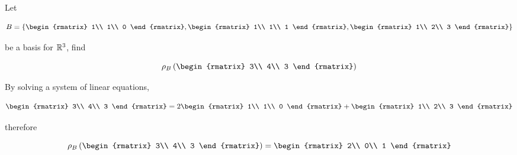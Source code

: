 \documentclass[a4paper,12pt]{article}
\begin{document}
\begin{exm}
  Let
  
  $$B=\brc{\begin{rmatrix}
    1\\
    1\\
    0
  \end{rmatrix},\begin{rmatrix}
    1\\
    1\\
    1
  \end{rmatrix},\begin{rmatrix}
    1\\
    2\\
    3
  \end{rmatrix}}$$\s

  be a basis for $\mathbb{R}^{3}$, find

  $$\rho_{B}\brr{\begin{rmatrix}
    3\\
    4\\
    3
  \end{rmatrix}}$$\s

  \ans By solving a system of linear equations,

  $$\begin{rmatrix}
    3\\
    4\\
    3
  \end{rmatrix}=2\begin{rmatrix}
    1\\
    1\\
    0
  \end{rmatrix}+\begin{rmatrix}
    1\\
    2\\
    3
  \end{rmatrix}$$\s

  therefore

  $$\rho_{B}\brr{\begin{rmatrix}
    3\\
    4\\
    3
  \end{rmatrix}}=\begin{rmatrix}
    2\\
    0\\
    1
  \end{rmatrix}$$
\end{exm}
\end{document}
